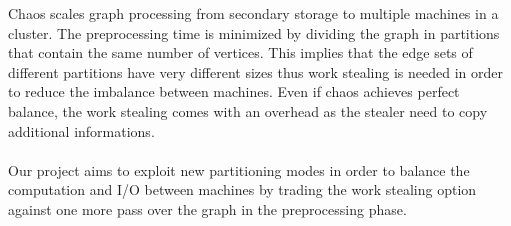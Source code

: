 Chaos scales graph processing from secondary storage to  multiple machines in a cluster. The preprocessing time is minimized by dividing the graph in partitions that contain the same number of vertices. This implies that the edge sets of different partitions have very different sizes thus work stealing is needed in order to reduce the imbalance between machines. Even if chaos achieves perfect balance, the work stealing comes with an overhead as the stealer need to copy additional informations.\\\\
Our project aims to exploit new partitioning modes in order to balance the computation and I/O between machines by trading the work stealing option against one more pass over the graph in the preprocessing phase.
 